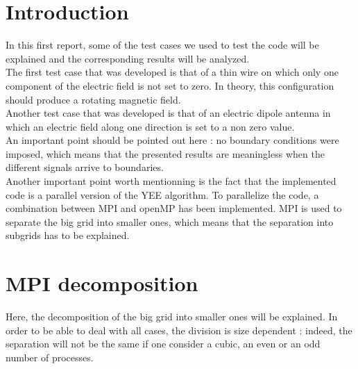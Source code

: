 \documentclass[12 pt]{report}
\begin{document}
\section{Introduction}
In this first report, some of the test cases we used to test the code will be explained and the corresponding results will be analyzed. \\
The first test case that was developed is that of a thin wire on which only one component of the electric field is not set to zero. In theory, this configuration should produce a rotating magnetic field. \\
Another test case that was developed is that of an electric dipole antenna in which an electric field along one direction is set to a non zero value. \\
An important point should be pointed out here : no boundary conditions were imposed, which means that the presented results are meaningless when the different signals arrive to boundaries. \\
Another important point worth mentionning is the fact that the implemented code is a parallel version of the YEE algorithm. To parallelize the code, a combination between MPI and openMP has been implemented. MPI is used to separate the big grid into smaller ones, which means that the separation into subgrids has to be explained.



\section{MPI decomposition}
Here, the decomposition of the big grid into smaller ones will be explained. In order to be able to deal with all cases, the division is size dependent : indeed, the separation will not be the same if one consider a cubic, an even or an odd number of processes.
\end{document}
